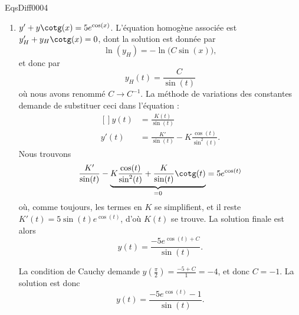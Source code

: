 \begin{corrige}{EqsDiff0004}
\begin{enumerate}
\item
$y'+y\cotg(x)=5 e^{\cos(x)}$. L'équation homogène associée est $y'_H+y_H\cotg(x)=0$, dont la solution est donnée par
\begin{equation}
	\ln(y_H)=-\ln\big( C\sin(x) \big),
\end{equation}
et donc par
\begin{equation}
	y_H(t)=\frac{ C }{ \sin(t) }
\end{equation}
où nous avons renommé $C\to C^{-1}$. La méthode de variations des constantes demande de substituer ceci dans l'équation :
\begin{equation}
	\begin{aligned}[]
		y(t)&=\frac{ K(t) }{ \sin(t) }\\
		y'(t)&=\frac{ K' }{ \sin(t) }-K\frac{ \cos(t) }{ \sin^2(t) }.
	\end{aligned}
\end{equation}
Nous trouvons
\begin{equation}
	\frac{ K' }{ \sin(t) }-\underbrace{K\frac{ \cos(t) }{ \sin^2(t) }+\frac{ K }{ \sin(t) }\cotg(t)}_{=0}=5 e^{\cos(t)}
\end{equation}
où, comme toujours, les termes en $K$ se simplifient, et il reste $K'(t)=5\sin(t) e^{\cos(t)}$, d'où $K(t)$ se trouve. La solution finale est alors
\begin{equation}
	y(t)=\frac{ -5 e^{\cos(t)+C} }{ \sin(t) }.
\end{equation}

La condition de Cauchy demande $y(\frac{ \pi }{ 2 })=\frac{ -5+C }{ 1 }=-4$, et donc $C=-1$. La solution est donc
\begin{equation}
	y(t)=\frac{ -5 e^{\cos(t)}-1 }{ \sin(t) }.
\end{equation}


\end{enumerate}
\end{corrige}
